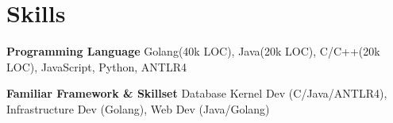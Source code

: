\documentclass[letterpaper,10pt]{article}
\newcommand{\resumeItem}[2]{
  \item\small{
    \textbf{\:#1}{ #2 \vspace{-4pt}}
  }
}
\begin{document}
    
    
        
\section{Skills}

  	\resumeItem
      {Programming Language}
      {Golang(40k LOC), Java(20k LOC), C/C++(20k LOC), JavaScript, Python, ANTLR4}
    
    \resumeItem
      {Familiar Framework \& Skillset}
      {Database Kernel Dev (C/Java/ANTLR4), Infrastructure Dev (Golang), Web Dev (Java/Golang)}


\end{document}
